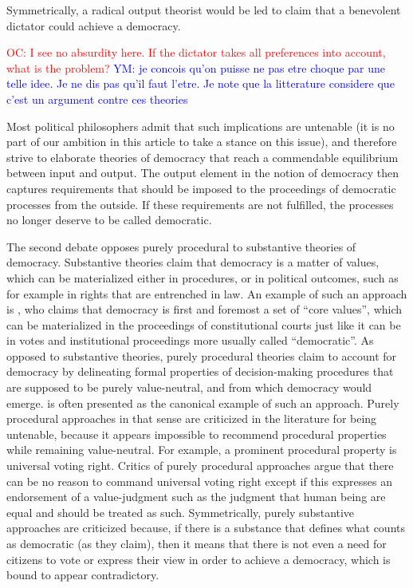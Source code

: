 \documentclass[preprint,11pt]{elsarticle}
\newcommand{\commentYM}[1]{\textcolor{blue}{YM: #1}}
\newcommand{\commentOC}[1]{\textcolor{red}{OC: #1}}
\begin{document}
Symmetrically, a radical output theorist would be led to claim that a benevolent dictator could achieve a democracy. 

\commentOC{ I see no absurdity here. If the
dictator takes all preferences into account, what is the
problem?
}
\commentYM{je concois qu'on puisse ne pas etre choque par une telle idee. Je ne dis pas qu'il faut l'etre. Je note que la litterature considere que c'est un argument contre ces theories}

Most political philosophers admit that such implications are untenable (it is no part of our ambition in this article to take a stance on this issue), and therefore strive to elaborate theories of democracy that reach a commendable equilibrium between input and output. The output element in the notion of democracy then captures requirements that should be imposed to the proceedings of democratic processes from the outside. If these requirements are not fulfilled, the processes no longer deserve to be called democratic. %

The second debate opposes purely procedural to substantive theories of democracy. Substantive theories claim that democracy is a matter of values, which can be materialized either in procedures, or in political outcomes, such as for example in rights that are entrenched in law. An example of such an approach is \cite{brettschneider_value_2006}, who claims that democracy is first and foremost a set of ``core values'', which can be materialized in the proceedings of constitutional courts just like it can be in votes and institutional proceedings more usually called ``democratic''. As opposed to substantive theories, purely procedural theories claim to account for democracy by delineating formal properties of decision-making procedures that are supposed to be purely value-neutral, and from which democracy would emerge. \cite{habermas_faktizitat_1992} is often presented as the canonical example of such an approach. Purely procedural approaches in that sense are criticized in the literature for being untenable, because it appears impossible to recommend procedural properties while remaining value-neutral. For example, a prominent procedural property is universal voting right. Critics of purely procedural approaches argue that there can be no reason to command universal voting right except if this expresses an endorsement of a value-judgment such as the judgment that human being are equal and should be treated as such. Symmetrically, purely substantive approaches are criticized because, if there is a substance that defines what counts as democratic (as they claim), then it means that there is not even a need for citizens to vote or express their view in order to achieve a democracy, which is bound to appear contradictory.
\end{document}
